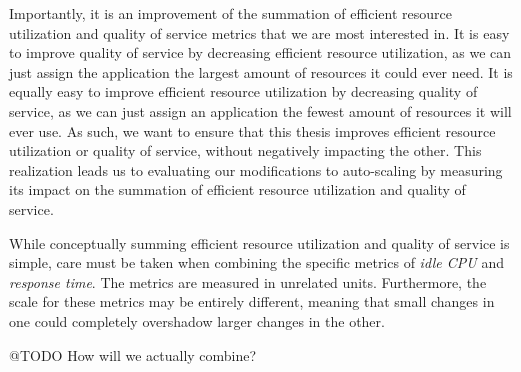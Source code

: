 Importantly, it is an improvement of the summation of efficient resource
utilization and quality of service metrics that we are most interested in. It is
easy to improve quality of service by decreasing efficient resource
utilization, as we can just assign the application the largest amount of
resources it could ever need. It is equally easy to improve efficient resource
utilization by decreasing quality of service, as we can just assign an
application the fewest amount of resources it will ever use. As such, we want to
ensure that this thesis improves efficient resource utilization or quality of
service, without negatively impacting the other. This realization leads us to
evaluating our modifications to auto-scaling by measuring its impact on the
summation of efficient resource utilization and quality of service.

While conceptually summing efficient resource utilization and quality of service
is simple, care must be taken when combining the specific metrics of
\textit{idle CPU} and \textit{response time}. The metrics are measured in unrelated
units. Furthermore, the scale for these metrics may be entirely different,
meaning that small changes in one could completely overshadow larger changes in
the other.

@TODO How will we actually combine?
